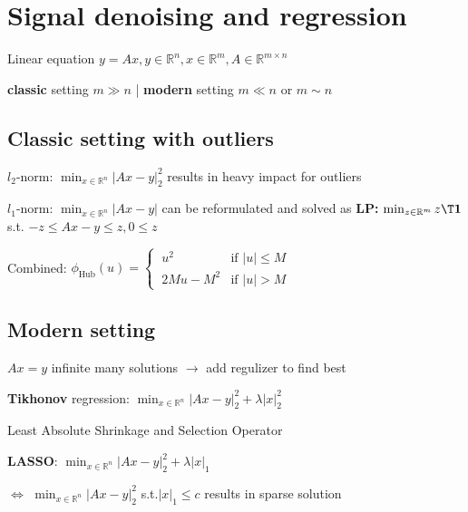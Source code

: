 \section{Signal denoising and regression}


Linear equation $y=Ax, y \in \mathbb{R}^{n}, x \in \mathbb{R}^{m}, A \in \mathbb{R}^{m \times n}$

\textbf{classic} setting $m \gg n$
|
\textbf{modern} setting $m\ll n$ or $m \sim n$

\subsection{Classic setting with outliers}

$l_2$-norm:
$\min_{x \in \mathbb{R}^{n}}|Ax-y|_2^2$
results in heavy impact for outliers

$l_1$-norm:
$\min_{x \in \mathbb{R}^{n}}|Ax-y|$
can be reformulated and solved as
\textbf{LP:}
$\min_{z\in\mathbb{R}^{m}}z\T\mathbf{1}$
s.t.
$-z\le Ax-y\le z, 0\le z$

Combined:
$\phi_\text{Hub}(u) =
	\begin{cases}
		\ u^2     & \text{if }|u|\le M \\
		\ 2Mu-M^2 & \text{if }|u|>M
	\end{cases}$


\subsection{Modern setting}

$Ax=y$ infinite many solutions
$\rightarrow$
add regulizer to find best

\textbf{Tikhonov} regression:
$\min_{x \in \mathbb{R}^{n}}|Ax-y|_2^2 + \lambda |x|_2^2$

Least Absolute Shrinkage and Selection Operator

\textbf{LASSO}:
$ \min_{x \in \mathbb{R}^{n}}|Ax-y|_2^2 + \lambda |x|_1$

$\Leftrightarrow$
$ \min_{x \in \mathbb{R}^{n}}|Ax-y|_2^2$ s.t.$|x|_1\le c$
results in sparse solution

